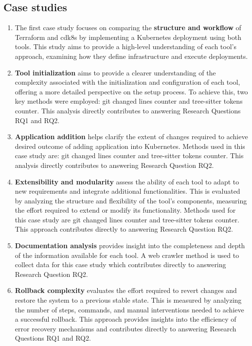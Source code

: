\documentclass{article}
\begin{document}
\subsection{Case studies}
\begin{enumerate}

\item \label{cs:workflow} The first case study focuses on comparing the \textbf{structure and workflow} of Terraform and cdk8s by implementing a Kubernetes deployment using both tools. This study aims to provide a high-level understanding of each tool’s approach, examining how they define infrastructure and execute deployments.

\item \label{cs:init}  \textbf{Tool initialization} aims to provide a clearer understanding of the complexity associated with the initialization and configuration of each tool, offering a more detailed perspective on the setup process. To achieve this, two key methods were employed: git changed lines counter and tree-sitter tokens counter. This analysis directly contributes to answering Research Questions RQ1 and RQ2.

\item \label{cs:app-add}  \textbf{Application addition} helps clarify the extent of changes required to achieve desired outcome of adding application into Kubernetes. Methods used in this case study are: git changed lines counter and tree-sitter tokens counter. This analysis directly contributes to answering Research Question RQ2.

\item \label{cs:mod} \textbf{Extensibility and modularity} assess the ability of each tool to adapt to new requirements and integrate additional functionalities. This is evaluated by analyzing the structure and flexibility of the tool’s components, measuring the effort required to extend or modify its functionality. Methods used for this case study are git changed lines counter and tree-sitter tokens counter. This approach contributes directly to answering Research Question RQ2.

\item \label{cs:doc} \textbf{Documentation analysis} provides insight into the completeness and depth of the information available for each tool. A web crawler method is used to collect data for this case study which contributes directly to answering Research Question RQ2.

\item \label{cs:rollback} \textbf{Rollback complexity} evaluates the effort required to revert changes and restore the system to a previous stable state. This is measured by analyzing the number of steps, commands, and manual interventions needed to achieve a successful rollback. This approach provides insights into the efficiency of error recovery mechanisms and contributes directly to answering Research Questions RQ1 and RQ2.


\end{enumerate}
\end{document}
